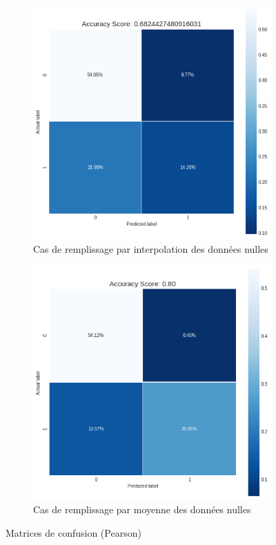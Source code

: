 \documentclass[12pt, a4paper]{article}
\begin{document}
    \begin{figure}[H]
     \centering
     \begin{subfigure}[b]{6.75cm}
           \centering
           \includegraphics[width=\textwidth]{images/confusion_matrix_randTree_case1.png}
           \caption{Cas de remplissage par interpolation des données nulles}
            \label{fig:randTree_corr_matrix_inter}
     \end{subfigure}
     \hfill
     \begin{subfigure}[b]{6.75cm}
            \centering
           \includegraphics[width=\textwidth]{images/output_85_0.png}
           \caption{Cas de remplissage par moyenne des données nulles}
            \label{fig:randree_corr_matrix_mean}
     \end{subfigure}
    \caption{Matrices de confusion (Pearson)}
    \label{fig:mat_conf_randTree}
    \end{figure}
\end{document}
